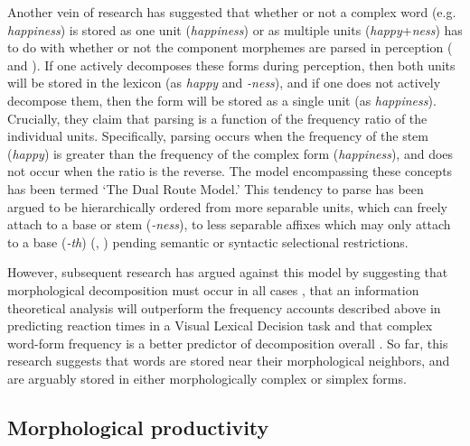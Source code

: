 \documentclass[output=paper,modfonts]{langscibook}
\begin{document}
Another vein of research has suggested that whether or not a complex word (e.g. \textit{happiness}) is stored as one unit (\textit{happiness}) or as multiple units (\textit{happy}+\textit{ness}) has to do with whether or not the component morphemes are parsed in perception (\citealt{Baayen1992} and \citealt{Hay2002}). If one actively decomposes these forms during perception, then both units will be stored in the lexicon (as \textit{happy} and \textit{-ness}), and if one does not actively decompose them, then the form will be stored as a single unit (as \textit{happiness}). Crucially, they claim that parsing is a function of the frequency ratio of the individual units. Specifically, parsing occurs when the frequency of the stem (\textit{happy}) is greater than the frequency of the complex form (\textit{happiness}), and does not occur when the ratio is the reverse. The model encompassing these concepts has been termed ‘The Dual Route Model.’ This tendency to parse has been argued to be hierarchically ordered from more separable units, which can freely attach to a base or stem (\textit{-ness}), to less separable affixes which may only attach to a base (\textit{-th}) (\citealt{HayPlag2004}, \citealt{PlagBaayen2009})  pending semantic or syntactic selectional restrictions.

However, subsequent research has argued against this model by suggesting that morphological decomposition must occur in all cases \citep{Taft2004}, that an information theoretical analysis will outperform the frequency accounts described above in predicting reaction times in a Visual Lexical Decision task \citep{MoscosoEtAl2004}  and that complex word-form frequency is a better predictor of decomposition overall \citep{BaayenEtAl2007}. So far, this research suggests that words are stored near their morphological neighbors, and are arguably stored in either morphologically complex or simplex forms.


\subsection{Morphological productivity}\label{sec:kloehn:1.4}
\end{document}
